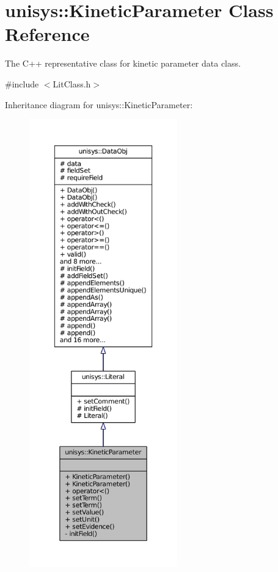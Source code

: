 \hypertarget{classunisys_1_1KineticParameter}{\section{unisys\-:\-:Kinetic\-Parameter Class Reference}
\label{classunisys_1_1KineticParameter}
}


The C++ representative class for kinetic parameter data class.  




{\ttfamily \#include $<$Lit\-Class.\-h$>$}



Inheritance diagram for unisys\-:\-:Kinetic\-Parameter\-:
\nopagebreak
\begin{figure}[H]
\begin{center}
\leavevmode
\includegraphics[height=550pt]{classunisys_1_1KineticParameter__inherit__graph}
\end{center}
\end{figure}


